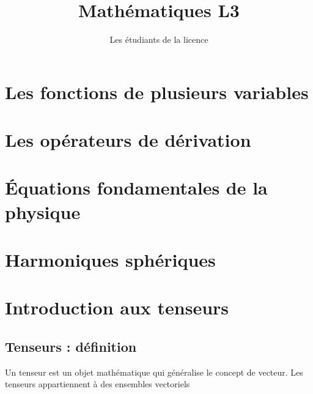 \documentclass[12pt,fleqn]{book}
\begin{document}
\title{Mathématiques L3}
\author{Les étudiants de la licence}
\maketitle



\chapter{Les fonctions de plusieurs variables}
\label{cha:les-fonctions-de}

\chapter{Les opérateurs de dérivation}
\label{cha:les-operateurs-de}

\chapter{Équations fondamentales de la physique}
\label{cha:equat-fond-de}

\chapter{Harmoniques sphériques}
\label{cha:harm-spher}

\chapter{Introduction aux tenseurs}
\label{cha:intr-aux-tens}
\section{Tenseurs : définition}
Un tenseur est un objet mathématique qui généralise le concept de vecteur. Les tenseurs appartiennent à des ensembles vectoriels
\end{document}
